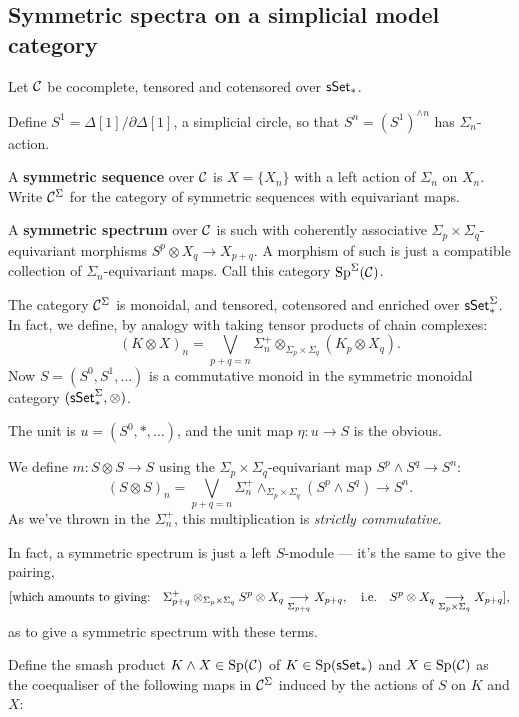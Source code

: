 \begin{MichaelStableModelCats}
\subsection*{Symmetric spectra on a simplicial model category}
\begin{itemise}
\item Let $\calC$ be cocomplete, tensored and cotensored over $\sSet_*$.
\item Define $S^1=\Delta[1]/\partial\Delta[1]$, a simplicial circle, so that $S^n=(S^1)^{\wedge n}$ has $\Sigma_n$-action.
\item A \textbf{symmetric sequence} over $\calC$ is $X=\{X_n\}$ with a left action of $\Sigma_n$ on $X_n$. Write $\calC^\Sigma$ for the category of symmetric sequences with equivariant maps.
\item A \textbf{symmetric spectrum} over $\calC$ is such with coherently associative $\Sigma_p\times\Sigma_q$-equivariant morphisms $S^p\otimes X_q\to X_{p+q}$. A morphism of such is just a compatible collection of $\Sigma_n$-equivariant maps. Call this category $\Sp^\Sigma(\calC)$.
\item The category $\calC^\Sigma$ is monoidal, and tensored, cotensored and enriched over $\sSet_*^\Sigma$. In fact, we define, by analogy with taking tensor products of chain complexes:
\[(K\otimes X)_n=\bigvee_{p+q=n}\Sigma_n^+\otimes_{\Sigma_p\times\Sigma_q}(K_p\otimes X_q).\]
Now $S=(S^0,S^1,\ldots)$ is a commutative monoid in the symmetric monoidal category $(\sSet_*^\Sigma,\otimes)$.
\begin{itemise}
\item The unit is $u=(S^0,*,\ldots)$, and the unit map $\eta:u\to S$ is the obvious. 
\item We define $m:S\otimes S\to S$   using the $\Sigma_p\times\Sigma_q$-equivariant map $S^p\wedge S^q\to S^n$:
\[(S\otimes S)_n=\bigvee_{p+q=n}\Sigma_n^+\wedge_{\Sigma_p\times\Sigma_q}(S^p\wedge S^q)\to S^n.\]
As we've thrown in the $\Sigma_n^+$, this multiplication is \emph{strictly commutative}.
\end{itemise}
\item In fact, a symmetric spectrum is just a left $S$-module --- it's the same to give the pairing, 
\[\text{[which amounts to giving:\quad}\Sigma_{p+q}^+\otimes_{\Sigma_p\times\Sigma_q} S^p\otimes X_q\underset{\Sigma_{p+q}}{\to} X_{p+q},\quad\text{i.e.}\quad S^p\otimes X_q\underset{\Sigma_p\times\Sigma_q}{\to} X_{p+q}\text{]},\]
as to give a symmetric spectrum with these terms.
\item Define the smash product  $K\wedge X\in\Sp(\calC)$ of $K\in \Sp(\sSet_*)$ and $X\in \Sp(\calC)$ as the coequaliser of the following maps in $\calC^\Sigma$ induced by the actions of $S$ on $K$ and $X$:

\end{itemise}
\end{MichaelStableModelCats}
